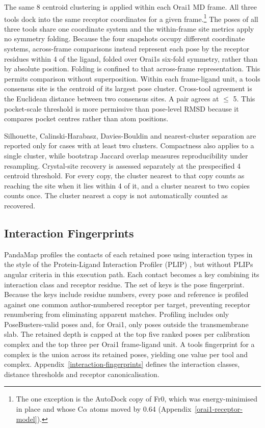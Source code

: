 The same 8\angstrom{} centroid clustering is applied within each Orai1 MD frame. All three tools dock into the same receptor coordinates for a given frame.\footnote{The one exception is the AutoDock copy of Fr0, which was energy-minimised in place and whose C\ensuremath{\alpha} atoms moved by 0.64\angstrom{} (Appendix~\ref{orai1-receptor-model}).} The poses of all three tools share one coordinate system and the within-frame site metrics apply no symmetry folding. Because the four snapshots occupy different coordinate systems, across-frame comparisons instead represent each pose by the receptor residues within 4\angstrom{} of the ligand, folded over Orai1\textquotesingle s six-fold symmetry, rather than by absolute position. Folding is confined to that across-frame representation. This permits comparison without superposition. Within each frame-ligand unit, a tool\textquotesingle s consensus site is the centroid of its largest pose cluster. Cross-tool agreement is the Euclidean distance between two consensus sites. A pair agrees at \ensuremath{\leq} 5\angstrom{}. This pocket-scale threshold is more permissive than pose-level RMSD because it compares pocket centres rather than atom positions.

Silhouette, Calinski-Harabasz, Davies-Bouldin and nearest-cluster separation are reported only for cases with at least two clusters. Compactness also applies to a single cluster, while bootstrap Jaccard overlap measures reproducibility under resampling. Crystal-site recovery is assessed separately at the prespecified 4\angstrom{} centroid threshold. For every copy, the cluster nearest to that copy counts as reaching the site when it lies within 4\angstrom{} of it, and a cluster nearest to two copies counts once. The cluster nearest a copy is not automatically counted as recovered.

\hypertarget{interaction-fingerprints-metric}{%
\subsection{Interaction Fingerprints}\label{interaction-fingerprints-metric}}

PandaMap profiles the contacts of each retained pose \cite{ref090} using interaction types in the style of the Protein-Ligand Interaction Profiler (PLIP) \cite{ref054}, but without PLIP\textquotesingle s angular criteria in this execution path. Each contact becomes a key combining its interaction class and receptor residue. The set of keys is the pose fingerprint. Because the keys include residue numbers, every pose and reference is profiled against one common author-numbered receptor per target, preventing receptor renumbering from eliminating apparent matches. Profiling includes only PoseBusters-valid poses and, for Orai1, only poses outside the transmembrane slab. The retained depth is capped at the top five ranked poses per calibration complex and the top three per Orai1 frame-ligand unit. A tool\textquotesingle s fingerprint for a complex is the union across its retained poses, yielding one value per tool and complex. Appendix~\ref{interaction-fingerprints} defines the interaction classes, distance thresholds and receptor canonicalisation.

